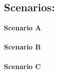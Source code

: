 \subsection{Scenarios:}
\textbf{Scenario A} \\ \\
\textbf{Scenario B} \\ \\
\textbf{Scenario C} \\ \\

